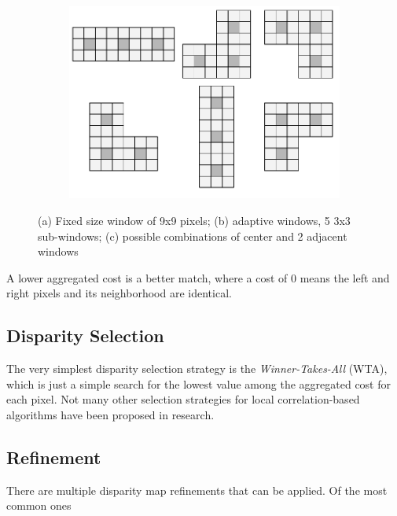 \begin{figure}
\begin{subfigure}[b]{0.20\textwidth}
    \caption{}
  \end{subfigure}
  ~
  \begin{subfigure}[t]{0.40\textwidth}
    \includegraphics[width=\textwidth]{images/adaptive-windows-shapes.pdf}
    \caption{}
  \end{subfigure}
  \caption{(a) Fixed size window of 9x9 pixels; (b) adaptive windows,
    5 3x3 sub-windows; (c) possible combinations of center and 2
    adjacent windows}
\end{figure}


A lower aggregated cost is a better match, where a cost of 0 means the
left and right pixels and its neighborhood are identical.


\subsection{Disparity Selection}
\label{sec:disparity_selection}

The very simplest disparity selection strategy is the
\textit{Winner-Takes-All} (WTA), which is just a simple search for the
lowest value among the aggregated cost for each pixel. Not many other
selection strategies for local correlation-based algorithms have been
proposed in research. 

\subsection{Refinement}
\label{sec:refinement}

There are multiple disparity map refinements that can be applied. Of
the most common ones

